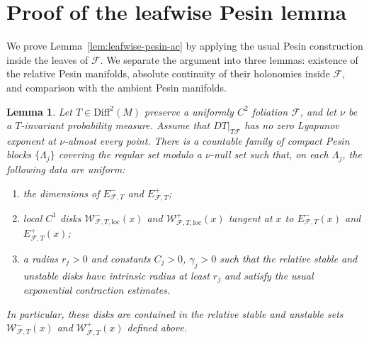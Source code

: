 \documentclass[11pt]{amsart}
\numberwithin{equation}{section}
\newcommand{\Diff}{\mathrm{Diff}}
\theoremstyle{plain}
\newtheorem{lem}[thm]{Lemma}
\begin{document}
\appendix
\section{Proof of the leafwise Pesin lemma}
\label{app:leafwise-pesin-proof}

We prove Lemma~\ref{lem:leafwise-pesin-ac} by applying the usual Pesin
construction inside the leaves of $\mathcal F$.  We separate the argument
into three lemmas: existence of the relative Pesin manifolds, absolute
continuity of their holonomies inside $\mathcal F$, and comparison with the
ambient Pesin manifolds.

\begin{lem}
\label{lem:app-relative-pesin}
Let $T\in\Diff^2(M)$ preserve a uniformly $C^2$ foliation $\mathcal F$,
and let $\nu$ be a $T$-invariant probability measure.  Assume that
$DT|_{T\mathcal F}$ has no zero Lyapunov exponent at $\nu$-almost every
point.  There is a countable family of compact Pesin blocks
$\{\Lambda_j\}$ covering the regular set modulo a $\nu$-null set such that, on
each $\Lambda_j$, the following data are uniform:
\begin{enumerate}
\item the dimensions of $E^-_{\mathcal F,T}$ and $E^+_{\mathcal F,T}$;
\item local $C^1$ disks
$\mathcal W^-_{\mathcal F,T,\mathrm{loc}}(x)$ and
$\mathcal W^+_{\mathcal F,T,\mathrm{loc}}(x)$ tangent at $x$ to
$E^-_{\mathcal F,T}(x)$ and $E^+_{\mathcal F,T}(x)$;
\item a radius $r_j>0$ and constants $C_j>0$, $\gamma_j>0$ such that the
relative stable and unstable disks have intrinsic radius at least $r_j$ and
satisfy the usual exponential contraction estimates.
\end{enumerate}
In particular, these disks are contained in the relative stable and unstable
sets $\mathcal W^-_{\mathcal F,T}(x)$ and
$\mathcal W^+_{\mathcal F,T}(x)$ defined above.
\end{lem}
\end{document}
